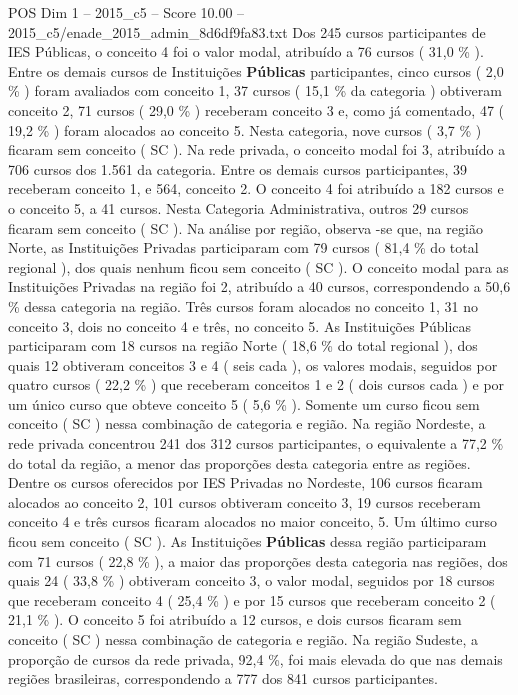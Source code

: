 \begin{textsample}{POS Dim 1 – 2015\_c5 – Score 10.00 – 2015\_c5/enade\_2015\_admin\_8d6df9fa83.txt}
Dos 245 cursos participantes de IES Públicas, o conceito 4 foi o valor modal, atribuído a 76 cursos ( 31,0 \% ).
Entre os demais cursos de Instituições \textbf{Públicas} participantes, cinco cursos ( 2,0 \% ) foram avaliados com conceito 1, 37 cursos ( 15,1 \% da categoria ) obtiveram conceito 2, 71 cursos ( 29,0 \% ) receberam conceito 3 e, como já comentado, 47 ( 19,2 \% ) foram alocados ao conceito 5.
Nesta categoria, nove cursos ( 3,7 \% ) ficaram sem conceito ( SC ).
Na rede privada, o conceito modal foi 3, atribuído a 706 cursos dos 1.561 da categoria.
Entre os demais cursos participantes, 39 receberam conceito 1, e 564, conceito 2.
O conceito 4 foi atribuído a 182 cursos e o conceito 5, a 41 cursos.
Nesta Categoria Administrativa, outros 29 cursos ficaram sem conceito ( SC ).
Na análise por região, observa -se que, na região Norte, as Instituições Privadas participaram com 79 cursos ( 81,4 \% do total regional ), dos quais nenhum ficou sem conceito ( SC ).
O conceito modal para as Instituições Privadas na região foi 2, atribuído a 40 cursos, correspondendo a 50,6 \% dessa categoria na região.
Três cursos foram alocados no conceito 1, 31 no conceito 3, dois no conceito 4 e três, no conceito 5.
As Instituições Públicas participaram com 18 cursos na região Norte ( 18,6 \% do total regional ), dos quais 12 obtiveram conceitos 3 e 4 ( seis cada ), os valores modais, seguidos por quatro cursos ( 22,2 \% ) que receberam conceitos 1 e 2 ( dois cursos cada ) e por um único curso que obteve conceito 5 ( 5,6 \% ).
Somente um curso ficou sem conceito ( SC ) nessa combinação de categoria e região.
Na região Nordeste, a rede privada concentrou 241 dos 312 cursos participantes, o equivalente a 77,2 \% do total da região, a menor das proporções desta categoria entre as regiões.
Dentre os cursos oferecidos por IES Privadas no Nordeste, 106 cursos ficaram alocados ao conceito 2, 101 cursos obtiveram conceito 3, 19 cursos receberam conceito 4 e três cursos ficaram alocados no maior conceito, 5.
Um último curso ficou sem conceito ( SC ).
As Instituições \textbf{Públicas} dessa região participaram com 71 cursos ( 22,8 \% ), a maior das proporções desta categoria nas regiões, dos quais 24 ( 33,8 \% ) obtiveram conceito 3, o valor modal, seguidos por 18 cursos que receberam conceito 4 ( 25,4 \% ) e por 15 cursos que receberam conceito 2 ( 21,1 \% ).
O conceito 5 foi atribuído a 12 cursos, e dois cursos ficaram sem conceito ( SC ) nessa combinação de categoria e região.
Na região Sudeste, a proporção de cursos da rede privada, 92,4 \%, foi mais elevada do que nas demais regiões brasileiras, correspondendo a 777 dos 841 cursos participantes.

\end{textsample}
